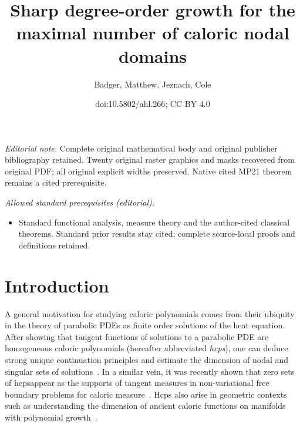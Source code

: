 \documentclass[10pt]{amsart}
\title{Sharp degree-order growth for the maximal number of caloric nodal domains}
\author{Badger, Matthew, Jeznach, Cole}
\date{doi:10.5802/ahl.266; CC BY 4.0}
\theoremstyle{definition}\newtheorem{defi}[theo]{Definition}\newtheorem{rema}[theo]{Remark}\newtheorem{exam}[theo]{Example}\newtheorem{exem}[theo]{Example}\newtheorem{nota}[theo]{Notation}
\begin{document}
\maketitle
\noindent\textit{Editorial note.} Complete original mathematical body and original publisher bibliography retained. Twenty original raster graphics and masks recovered from original PDF; all original explicit widths preserved. Native cited MP21 theorem remains a cited prerequisite.\par\medskip
\noindent\textit{Allowed standard prerequisites (editorial).}\begin{itemize}
\item Standard functional analysis, measure theory and the author-cited classical theorems. Standard prior results stay cited; complete source-local proofs and definitions retained.
\end{itemize}\medskip

\section{Introduction}\label{s:intro}

A general motivation for studying caloric polynomials comes from their ubiquity in the theory of parabolic PDEs as finite order solutions of the heat equation. After showing that tangent functions of solutions to a parabolic PDE are homogeneous caloric polynomials (hereafter abbreviated \emph{hcps}), one can deduce strong unique continuation principles and estimate the dimension of nodal and singular sets of solutions~\cite{Chen98}. In a similar vein, it was recently shown that zero sets of hcps\linebreak appear as the supports of tangent measures in non-variational free boundary problems for caloric measure~\cite{MP21}. Hcps also arise in geometric contexts such as understanding the dimension of ancient caloric functions on manifolds with polynomial growth~\cite{CM21}.
\end{document}
